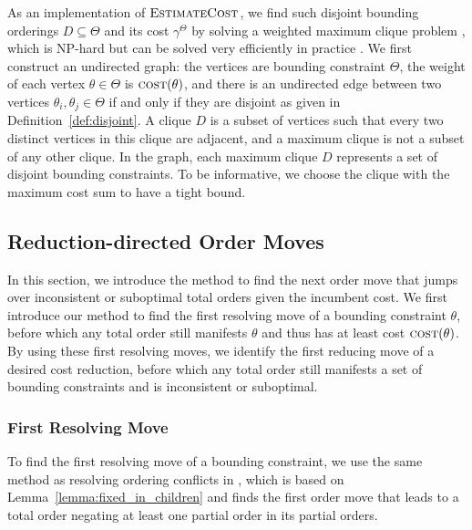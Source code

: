 \documentclass[letterpaper]{article} %
\theoremstyle{definition}
\begin{document}
As an implementation of $\textsc{EstimateCost}$, we find such disjoint bounding orderings $D \subseteq \Theta$ and its cost $\gamma^\Theta$ by solving a weighted maximum clique problem \cite{bomze1999maximum}, which is NP-hard but can be solved very efficiently in practice \cite{cai2016fast,balas1996weighted}. We first construct an undirected  graph: the vertices are bounding constraint $\Theta$, the weight of each vertex $\theta \in \Theta$ is $\textsc{cost}(\theta)$, and there is an undirected edge between two vertices $\theta_i, \theta_j \in \Theta$ if and only if they are disjoint as given in Definition~\ref{def:disjoint}.  A clique $D$ is a subset of vertices such that every two distinct vertices in this clique are adjacent, and a maximum clique is not a subset of any other clique.  
In the graph, each maximum clique $D$ represents a set of disjoint bounding constraints. To be informative, we choose the clique with the maximum cost sum to have a tight bound. 


\subsection{Reduction-directed Order Moves} 
\label{sec:approach:reduce}
In this section, we introduce the method to find the next order move that jumps over inconsistent or suboptimal total orders given the incumbent cost. We first introduce our method to find the first resolving move of a bounding constraint $\theta$, before which any total order still manifests $\theta$ and thus has at least cost $\textsc{cost}(\theta)$.  By using these first resolving moves, we identify the first reducing move of a desired cost reduction, before which any total order still manifests a set of bounding constraints and is inconsistent or suboptimal.

\subsubsection{First Resolving Move}
\label{sec:approach:cdito:resolution}

To find the first resolving move of a bounding constraint, we use the same method as resolving ordering conflicts in \cite{chen2019efficiently}, which is based on Lemma~\ref{lemma:fixed_in_children} and finds the first order move that leads to a total order negating at least one partial order in its partial orders.
\end{document}

